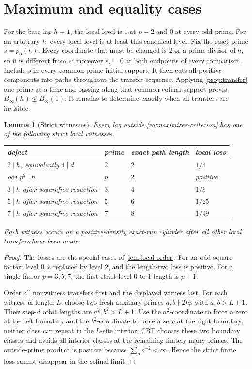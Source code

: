 \documentclass[12pt,a4paper]{article}
\newtheorem{lemma}[theorem]{Lemma}
\theoremstyle{definition}
\newcommand{\Bin}{B_\infty}
\begin{document}
\section{Maximum and equality cases}

For the base lag \(h=1\), the local level is \(1\) at \(p=2\) and \(0\) at
every odd prime.  For an arbitrary \(h\), every local level is at least this
canonical level.  Fix the reset prime \(s=p_0(h)\).  Every coordinate that
must be changed is \(2\) or a prime divisor of \(h\), so it is different from
\(s\); moreover \(e_s=0\) at both endpoints of every comparison.  Include
\(s\) in every common prime-initial support.  It then cuts all positive
components into paths throughout the transfer sequence.  Applying
\cref{prop:transfer} one prime at a time and passing along that common cofinal
support proves \(\Bin(h)\leq\Bin(1)\).  It remains to determine exactly when
all transfers are invisible.

\begin{lemma}[Strict witnesses]
\label{lem:strict-witnesses}
Every lag outside \eqref{eq:maximizer-criterion} has one of the following
strict local witnesses.
\begin{center}
\begin{tabular}{@{}llll@{}}
\toprule
defect & prime & exact path length & local loss \\ \midrule
\(2\mid h\), equivalently \(4\mid d\) & \(2\) & \(2\) & \(1/4\)\\
odd \(p^2\mid h\) & \(p\) & \(2\) & positive\\
\(3\mid h\) after squarefree reduction & \(3\) & \(4\) & \(1/9\)\\
\(5\mid h\) after squarefree reduction & \(5\) & \(6\) & \(1/25\)\\
\(7\mid h\) after squarefree reduction & \(7\) & \(8\) & \(1/49\)\\
\bottomrule
\end{tabular}
\end{center}
Each witness occurs on a positive-density exact-run cylinder after all other
local transfers have been made.
\end{lemma}

\begin{proof}
The losses are the special cases of \cref{lem:local-order}.  For an odd square
factor, level \(0\) is replaced by level \(2\), and the length-two loss is
positive.  For a single factor \(p=3,5,7\), the first strict level
\(0\)-to-\(1\) length is \(p+1\).

Order all nonwitness transfers first and the displayed witness last.  For each
witness of length \(L\), choose two fresh auxiliary primes
\(a,b\nmid 2hp\) with \(a,b>L+1\).  Their step-\(d\) orbit lengths are
\(a^2,b^2>L+1\).  Use the \(a^2\)-coordinate to force a zero at the left
boundary and the \(b^2\)-coordinate to force a zero at the right boundary;
neither class can repeat in the \(L\)-site interior.  CRT chooses these two
boundary classes and avoids all interior classes at the remaining finitely
many primes.  The outside-prime product is positive because
\(\sum_p p^{-2}<\infty\).  Hence the strict finite loss cannot disappear in
the cofinal limit.
\end{proof}
\end{document}
